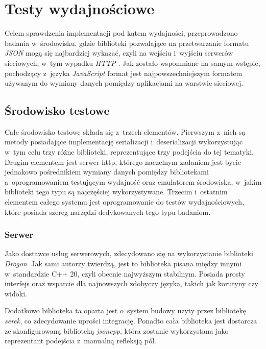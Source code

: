 \documentclass[12pt]{article}
\newcommand{\n}{\newline}
\newcommand{\nonpl}[1]{{\it #1}}
\newcommand{\JSON}{\nonpl{JSON} }
\newcommand{\HTTP}{\nonpl{HTTP} }
\newcommand{\serek}{\nonpl{serek}}
\begin{document}
	{
		\section{Testy wydajnościowe}

		Celem sprawdzenia implementacji pod kątem wydajności, przeprowadzono badania w~środowisku, gdzie biblioteki pozwalające na przetwarzanie
		formatu \JSON mogą się najbardziej wykazać, czyli na wejściu i~wyjściu serwerów sieciowych, w~tym wypadku \HTTP. Jak zostało wspomniane
		na samym wstępie, pochodzący z~języka \nonpl{JavaScript} format jest najpowszechniejszym formatem \cite{google_trends_json_api_vs_rest_of_the_world}
		używanym do wymiany danych pomiędzy aplikacjami na warstwie sieciowej.

		{
			\subsection{Środowisko testowe}

			Całe środowisko testowe składa się z~trzech elementów. Pierwszym z~nich są metody posiadające implementację serializacji i~deserializacji
			wykorzystując w~tym celu trzy różne biblioteki, reprezentujące trzy podejścia do tej tematyki. Drugim elementem jest serwer http, którego
			naczelnym zadaniem jest bycie jednakowo pośrednikiem wymiany danych pomiędzy bibliotekami a~oprogramowaniem testującym wydajność oraz
			emulatorem środowiska, w~jakim biblioteki tego typu są najczęściej wykorzystywane. Trzecim i~ostatnim elementem całego systemu jest
			oprogramowanie do testów wydajnościowych, które posiada szereg narzędzi dedykowanych tego typu badaniom.

			{
				\subsubsection{Serwer}

				Jako dostawce usług serwerowych, zdecydowano się na wykorzystanie biblioteki \nonpl{Drogon}\cite{drogon}. Jak sami autorzy twierdzą,
				jest to biblioteka pisana między innymi w~standardzie C++ 20, czyli obecnie najwyższym stabilnym. Posiada prosty interfejs oraz
				wsparcie dla najnowszych zdobyczy języka, takich jak korutyny czy widoki.\n

				Dodatkowo biblioteka ta oparta jest o~system budowy użyty przez bibliotekę \serek, co zdecydowanie uprości integrację. Ponadto
				cała biblioteka jest dostarcza ze skonfigurowaną biblioteką \nonpl{jsoncpp}\cite{jsoncpp_repo}, która zostanie wykorzystana jako
				reprezentant podejścia z~manualną refleksją pól.\n

}}}
\end{document}
